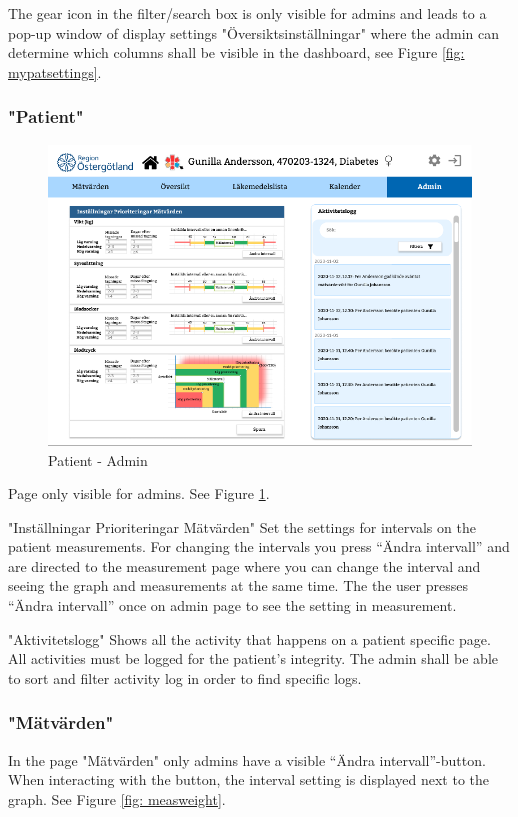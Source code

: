 \documentclass{scrreprt}
\begin{document}
The gear icon in the filter/search box is only visible for admins and leads to a pop-up window of display settings "Översiktsinställningar" where the admin can determine which columns shall be visible in the dashboard, see Figure \ref{fig: mypatsettings}.

\subsubsection{"Patient"}
\begin{figure}[h!]
    \centering
    \includegraphics[width=15cm]{patadmin.png}
    \caption{Patient - Admin}
    \label{fig: patadmin}
\end{figure}

Page only visible for admins. See Figure \ref{fig: patadmin}.

"Inställningar Prioriteringar Mätvärden"
Set the settings for intervals on the patient measurements. For changing the intervals you press “Ändra intervall” and are directed to the measurement page where you can change the interval and seeing the graph and measurements at the same time. The the user presses “Ändra intervall” once on admin page to see the setting in measurement.

"Aktivitetslogg"
Shows all the activity that happens on a patient specific page. All activities must be logged for the patient's integrity. The admin shall be able to sort and filter activity log in order to find specific logs.

\subsubsection{"Mätvärden"}
In the page "Mätvärden" only admins have a visible  “Ändra intervall”-button. When interacting with the button, the interval setting is displayed next to the graph. See Figure \ref{fig: measweight}.
\end{document}
